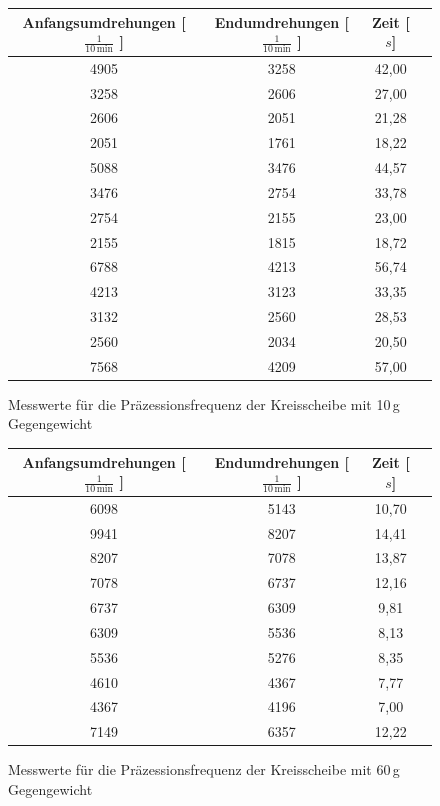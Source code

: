 \documentclass[fontsize=12pt]{scrartcl}
\begin{document}
\begin{figure}[H]
\centering
\caption{Messwerte für die Präzessionsfrequenz der Kreisscheibe mit 10\,g Gegengewicht}
\begin{tabular}{|c|c|c|c|} \hline
Anfangsumdrehungen [$ \frac{1}{10\,\text{min}}$ ]  &  Endumdrehungen [$\frac{1}{10\,\text{min}}$ ]  &  Zeit [$s$] \\ \hline
4905	&3258	&42,00\\ \hline
3258	&2606	&27,00\\ \hline
2606	&2051	&21,28\\ \hline
2051	&1761	&18,22\\ \hline
5088	&3476	&44,57\\ \hline
3476	&2754	&33,78\\ \hline
2754	&2155	&23,00\\ \hline
2155	&1815	&18,72\\ \hline
6788	&4213	&56,74\\ \hline
4213	&3123	&33,35\\ \hline
3132	&2560	&28,53\\ \hline
2560	&2034	&20,50\\ \hline
7568	&4209	&57,00\\ \hline
\end{tabular}				 
\end{figure}
\begin{figure}[H]
\centering
\caption{Messwerte für die Präzessionsfrequenz der Kreisscheibe mit 60\,g Gegengewicht}
\begin{tabular}{|c|c|c|c|} \hline
Anfangsumdrehungen [$ \frac{1}{10\,\text{min}}$ ]  &  Endumdrehungen [$\frac{1}{10\,\text{min}}$ ]  &  Zeit [$s$] \\ \hline
6098	&5143	&10,70\\ \hline
9941	&8207	&14,41\\ \hline
8207	&7078	&13,87\\ \hline
7078	&6737	&12,16\\ \hline
6737	&6309	&9,81\\ \hline
6309	&5536	&8,13\\ \hline
5536	&5276	&8,35\\ \hline
4610	&4367	&7,77\\ \hline
4367	&4196	&7,00\\ \hline
7149	&6357	&12,22\\ \hline
\end{tabular}				 
\end{figure}
\end{document}
